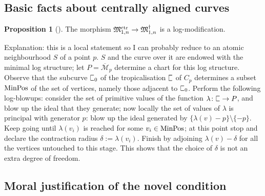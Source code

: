 \documentclass[11pt]{amsart}
\newcommand{\plC}{\scalebox{0.8}[1.3]{$\sqsubset$}}
\newcommand{\oM}{\overline{\mathcal{M}}}
\renewcommand{\to}{\rightarrow}
\newcommand{\MM}{\mathfrak M}
\theoremstyle{definition}
\newtheorem{prop}[thm]{Proposition}
\theoremstyle{definition}
\begin{document}
\subsection{Basic facts about centrally aligned curves}
\begin{prop}[{\cite[Proposition 4.6.2.2]{RSPW}}]
The morphism $\MM^{\rm{ctr}}_{1,n}\to\MM^{\dagger}_{1,n}$ is a log-modification.
\end{prop}

Explanation: this is a local statement so I can probably reduce to an atomic neighbourhood $S$ of a point $p$. $S$ and the curve over it are endowed with the minimal log structure; let $P=\oM_p$ determine a chart for this log structure. Observe that the subcurve $\plC_0$ of the tropicalisation $\plC$ of $C_p$ determines a subset $\rm{MinPos}$ of the set of vertices, namely those adjacent to $\plC_0$. Perform the following log-blowups: consider the set of primitive values of the function $\lambda\colon \plC\to P$, and blow up the ideal that they generate; now locally the set of values of $\lambda$ is principal with generator $p$: blow up the ideal generated by $\{\lambda(v)-p\}\setminus\{-p\}$. Keep going until $\lambda(v_i)$ is reached for some $v_i\in\rm{MinPos}$; at this point stop and declare the contraction radius $\delta:=\lambda(v_i)$. Finish by adjoining $\lambda(v)-\delta$ for all the vertices untouched to this stage. This shows that the choice of $\delta$ is not an extra degree of freedom.

\subsection{Moral justification of the novel condition}
\end{document}
